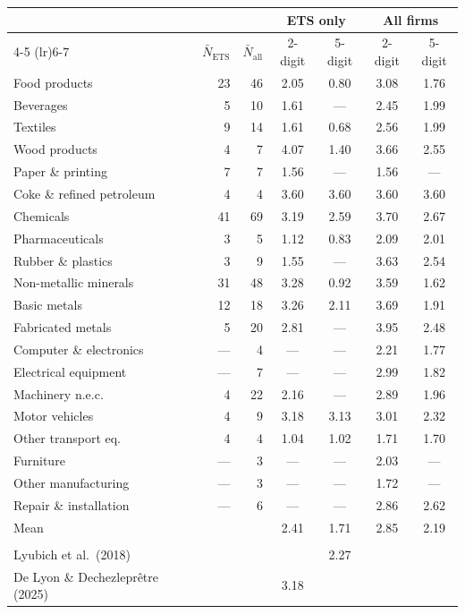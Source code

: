 \begin{tabular}{l r r cc cc}
\toprule
 & & & \multicolumn{2}{c}{ETS only} & \multicolumn{2}{c}{All firms} \\
\cmidrule(lr){4-5} \cmidrule(lr){6-7}
 & $\bar{N}_{\text{ETS}}$ & $\bar{N}_{\text{all}}$ & 2-digit & 5-digit & 2-digit & 5-digit \\
\midrule
Food products & 23 & 46 & 2.05 & 0.80 & 3.08 & 1.76 \\
Beverages & 5 & 10 & 1.61 & --- & 2.45 & 1.99 \\
Textiles & 9 & 14 & 1.61 & 0.68 & 2.56 & 1.99 \\
Wood products & 4 & 7 & 4.07 & 1.40 & 3.66 & 2.55 \\
Paper \& printing & 7 & 7 & 1.56 & --- & 1.56 & --- \\
Coke \& refined petroleum & 4 & 4 & 3.60 & 3.60 & 3.60 & 3.60 \\
Chemicals & 41 & 69 & 3.19 & 2.59 & 3.70 & 2.67 \\
Pharmaceuticals & 3 & 5 & 1.12 & 0.83 & 2.09 & 2.01 \\
Rubber \& plastics & 3 & 9 & 1.55 & --- & 3.63 & 2.54 \\
Non-metallic minerals & 31 & 48 & 3.28 & 0.92 & 3.59 & 1.62 \\
Basic metals & 12 & 18 & 3.26 & 2.11 & 3.69 & 1.91 \\
Fabricated metals & 5 & 20 & 2.81 & --- & 3.95 & 2.48 \\
Computer \& electronics & --- & 4 & --- & --- & 2.21 & 1.77 \\
Electrical equipment & --- & 7 & --- & --- & 2.99 & 1.82 \\
Machinery n.e.c. & 4 & 22 & 2.16 & --- & 2.89 & 1.96 \\
Motor vehicles & 4 & 9 & 3.18 & 3.13 & 3.01 & 2.32 \\
Other transport eq. & 4 & 4 & 1.04 & 1.02 & 1.71 & 1.70 \\
Furniture & --- & 3 & --- & --- & 2.03 & --- \\
Other manufacturing & --- & 3 & --- & --- & 1.72 & --- \\
Repair \& installation & --- & 6 & --- & --- & 2.86 & 2.62 \\
\midrule
Mean & & & 2.41 & 1.71 & 2.85 & 2.19 \\
\addlinespace[3pt]
\multicolumn{7}{l}{\textit{Literature benchmarks}} \\
\addlinespace[2pt]
Lyubich et al.\ (2018) & & & & 2.27 & & \\
De Lyon \& Dechezlepr\^{e}tre (2025) & & & 3.18 & & & \\
\bottomrule
\end{tabular}
